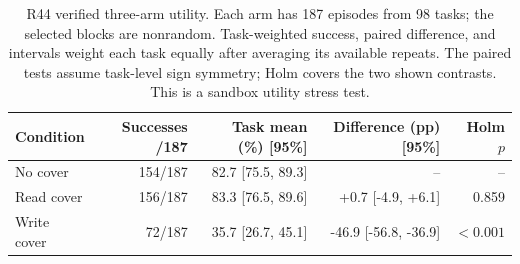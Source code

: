 \begin{table}[t]\centering\footnotesize
\caption{R44 verified three-arm utility. Each arm has 187 episodes from 98 tasks; the selected blocks are nonrandom. Task-weighted success, paired difference, and intervals weight each task equally after averaging its available repeats. The paired tests assume task-level sign symmetry; Holm covers the two shown contrasts. This is a sandbox utility stress test.}
\begin{tabular}{lrrrr}\hline
Condition & Successes /187 & Task mean (\%) [95\%] & Difference (pp) [95\%] & Holm $p$\\\hline
No cover & 154/187 & 82.7 [75.5, 89.3] & -- & --\\
Read cover & 156/187 & 83.3 [76.5, 89.6] & +0.7 [-4.9, +6.1] & 0.859\\
Write cover & 72/187 & 35.7 [26.7, 45.1] & -46.9 [-56.8, -36.9] & $<0.001$\\
\hline\end{tabular}
\end{table}

